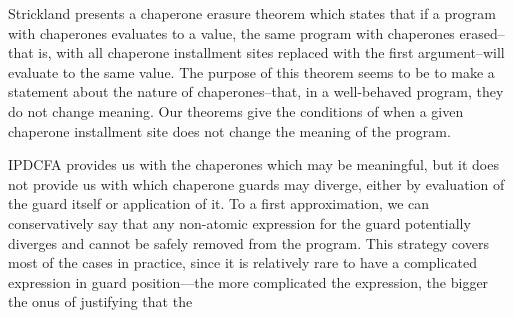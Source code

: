 \documentclass{sigplanconf}
\begin{document}

Strickland presents a chaperone erasure theorem which states that if a program with chaperones evaluates to a value, the same program with chaperones erased--that is, with all chaperone installment sites replaced with the first argument--will evaluate to the same value. The purpose of this theorem seems to be to make a statement about the nature of chaperones--that, in a well-behaved program, they do not change meaning. Our theorems give the conditions of when a given chaperone installment site does not change the meaning of the program.

IPDCFA provides us with the chaperones which may be meaningful, but it does not provide us with which chaperone guards may diverge, either by evaluation of the guard itself or application of it.
To a first approximation, we can conservatively say that any non-atomic expression for the guard potentially diverges and cannot be safely removed from the program.
This strategy covers most of the cases in practice, since it is relatively rare to have a complicated expression in guard position---the more complicated the expression, the bigger the onus of justifying that the 








\end{document}

